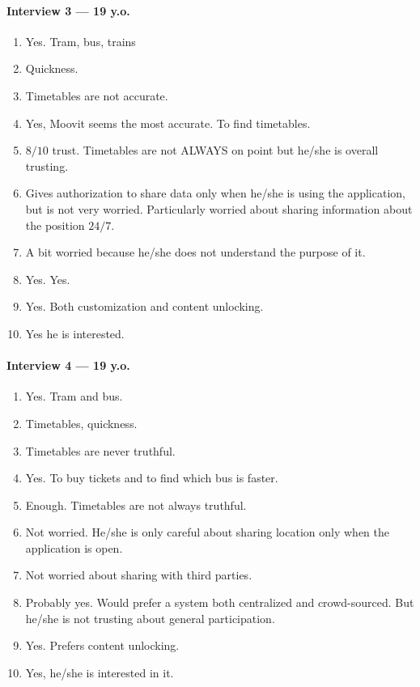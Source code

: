 \documentclass[a4paper, 11pt, twocolumn]{article}
\begin{document}
\paragraph*{Interview 3 --- 19 y.o.}
\begin{enumerate}
    \item Yes. Tram, bus, trains
    \item Quickness.
    \item Timetables are not accurate.
    \item Yes, Moovit seems the most accurate. To find timetables.
    \item $8/10$ trust. Timetables are not ALWAYS on point but he/she is overall trusting.
    \item Gives authorization to share data only when he/she is using the application, but is not very worried. Particularly worried about sharing information about the position $24/7$.
    \item A bit worried because he/she does not understand the purpose of it.
    \item Yes. Yes.
    \item Yes. Both customization and content unlocking.
    \item Yes he is interested.
\end{enumerate}

\paragraph*{Interview 4 --- 19 y.o.}
\begin{enumerate}
    \item Yes. Tram and bus.
    \item Timetables, quickness.
    \item Timetables are never truthful.
    \item Yes. To buy tickets and to find which bus is faster.
    \item Enough. Timetables are not always truthful.
    \item Not worried. He/she is only careful about sharing location only when the application is open.
    \item Not worried about sharing with third parties.
    \item Probably yes. Would prefer a system both centralized and crowd-sourced. But he/she is not trusting about general participation.
    \item Yes. Prefers content unlocking.
    \item Yes, he/she is interested in it.
\end{enumerate}
\end{document}
